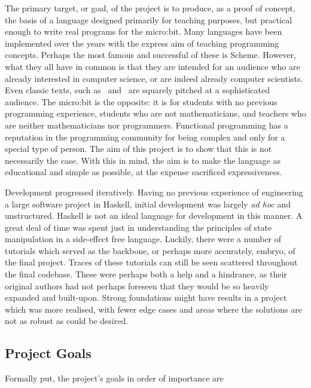 \documentclass[12pt, a4paper]{report}
\begin{document}
The primary target, or goal, of the project is to produce, as a proof of concept, the basis of a
language designed primarily for teaching purposes, but practical enough to write real programs for
the micro:bit. Many languages have been implemented over the years with the express aim of teaching
programming concepts. Perhaps the most famous and successful of these is Scheme. However, what they
all have in common is that they are intended for an audience who are already interested in computer
science, or are indeed already computer scientists. Even classic texts, such
as~\cite{Abelson:1996:SIC:547755} and~\cite{Friedman1900} are squarely pitched at a sophisticated audience.
The micro:bit is the opposite: it is for students with no previous programming experience,
students who are not mathematicians, and teachers who are neither mathematicians nor programmers.
Functional programming has a reputation in the programming community for being complex and only for a
special type of person. The aim of this project is to show that this is not necessarily the case.
With this in mind, the aim is to make the language as educational and simple as possible, at the expense 
sacrificed expressiveness. 

Development progressed iteratively. Having no previous experience of engineering a large software
project in Haskell, initial development was largely \textit{ad hoc} and unstructured. Haskell is not
an ideal language for development in this manner. A great deal of time was spent just in understanding 
the principles of state manipulation in a side-effect free language. Luckily, there were a number of 
tutorials which served as the backbone, or perhaps more accurately, embryo, of the final project. 
Traces of these tutorials can still be seen scattered throughout the final codebase. These were 
perhaps both a help and a hindrance, as their original authors had not perhaps foreseen that 
they would be so heavily expanded and built-upon. Strong foundations might have results in a project 
which was more realised, with fewer edge cases and areas where the solutions are not as robust as could be desired.

\subsection{Project Goals}
Formally put, the project's goals in order of importance are 
\end{document}
